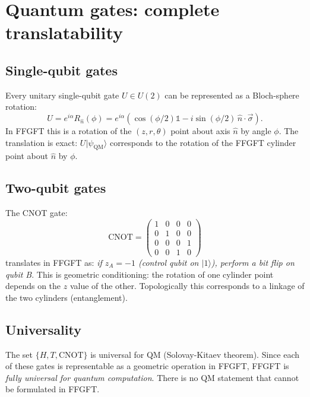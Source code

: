 \section{Quantum gates: complete translatability}

\subsection{Single-qubit gates}

Every unitary single-qubit gate $U \in U(2)$ can be represented as a
Bloch-sphere rotation:
\begin{equation}
  U = e^{i\alpha} R_{\hat n}(\phi)
    = e^{i\alpha}(\cos(\phi/2)\mathbb{1} - i\sin(\phi/2)\, \hat n \cdot \vec\sigma).
\end{equation}
In FFGFT this is a rotation of the $(z, r, \theta)$ point about axis
$\hat n$ by angle $\phi$. The translation is exact: $U |\psi_\text{QM}\rangle$
corresponds to the rotation of the FFGFT cylinder point about $\hat n$
by $\phi$.

\subsection{Two-qubit gates}

The CNOT gate:
\begin{equation}
  \text{CNOT} = \begin{pmatrix}
    1 & 0 & 0 & 0 \\
    0 & 1 & 0 & 0 \\
    0 & 0 & 0 & 1 \\
    0 & 0 & 1 & 0
  \end{pmatrix}
\end{equation}
translates in FFGFT as: \emph{if $z_A = -1$ (control qubit on
$|1\rangle$), perform a bit flip on qubit B}. This is geometric
conditioning: the rotation of one cylinder point depends on the
$z$ value of the other. Topologically this corresponds to a
linkage of the two cylinders (entanglement).

\subsection{Universality}

The set $\{H, T, \text{CNOT}\}$ is universal for QM (Solovay-Kitaev
theorem). Since each of these gates is representable as a geometric
operation in FFGFT, FFGFT is \emph{fully universal for quantum
computation}. There is no QM statement that cannot be formulated in
FFGFT.

